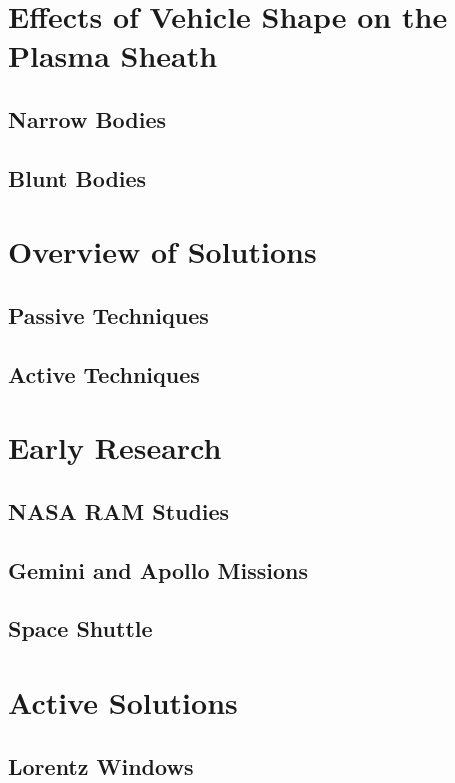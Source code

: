 \documentclass[twocolumn]{article}
\begin{document}
\section{Effects of Vehicle Shape on the Plasma Sheath}
\subsection{Narrow Bodies}
\subsection{Blunt Bodies}


\section{Overview of Solutions}
\subsection{Passive Techniques}
\subsection{Active Techniques}

	
\section{Early Research}
\subsection{NASA RAM Studies}
\subsection{Gemini and Apollo Missions}
\subsection{Space Shuttle}

\section{Active Solutions}
\subsection{Lorentz Windows}
\end{document}
